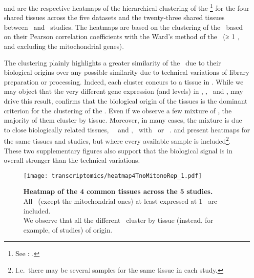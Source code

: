  and 
are the respective heatmaps of the hierarchical clustering
of the \treps{}\footnote{See :
.}
for the four shared tissues across the five datasets and the
twenty-three shared tissues between \uhlen\ and \gtex\ studies.
The heatmaps are based on the clustering of the \treps\ based on
their Pearson correlation coefficients with the Ward's method
of the \pcgs\ (≥ 1 \FPKM, and excluding
the mitochondrial genes).

The clustering plainly highlights a greater similarity of the \treps\
due to their biological origins over any possible
similarity due to technical variations of library preparation or processing.
Indeed, each cluster concurs to a tissue in \Cref{fig:noMitoNoRep4T}.
While we may object that
the very different gene expression (and levels) in
\Heart, \Kidney, \Liver\ and \Testis,
may drive this result,
 confirms that the biological origin of the tissues
is the dominant criterion for the clustering of the \treps.
Even if we observe a few mixture of \treps,
the majority of them cluster by tissue.
Moreover, in many cases, the mixture is due to close biologically related tissues,
\eg\ \fallopian\ and \Ovary, \salivary\
with \Esophagus\ or \Stomach\ \treps.
\Cref{fig:noMitoRep4T} and 
present heatmaps for the same tissues and studies,
but where every available sample is included\footnote{I.e.\
there may be several samples for the same tissue in each study.}.
These two supplementary figures also support that
the biological signal is in overall stronger than the technical variations.

\begin{figure}[!htpb]
    \texttt{[image: transcriptomics/heatmap4TnoMitonoRep\_1.pdf]}\centering
    \caption[Heatmap of the 4 common tissues across the 5 studies]%
    {\label{fig:noMitoNoRep4T}\textbf{Heatmap of the 4 common tissues
    across the 5 studies.}\\All \pcgs\ (except the mitochondrial
    ones) at least expressed at 1 \FPKM\ are included.\\We observe that all the
    different \treps\ cluster by tissue (instead, for example, of studies)
    of origin.}
\end{figure}

